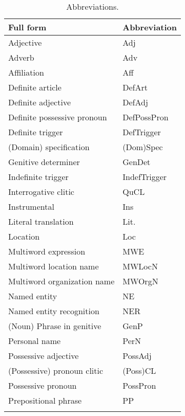 \documentclass[output=paper]{langsci/langscibook}
\begin{document}
\begin{table}
\begin{tabular}{ll}
\lsptoprule
Full form  & Abbreviation \\
\midrule
Adjective & Adj\\
Adverb & Adv\\
Affiliation & Aff\\
Definite article & DefArt\\
Definite adjective & DefAdj\\
Definite possessive pronoun & DefPossPron\\
Definite trigger & DefTrigger\\
(Domain) specification & (Dom)Spec\\
Genitive determiner & GenDet\\
Indefinite trigger & IndefTrigger\\
Interrogative clitic & QuCL\\
Instrumental & Ins\\
Literal translation & Lit.\\
Location & Loc\\
Multiword expression & MWE\\
Multiword location name & MWLocN\\
Multiword organization name & MWOrgN\\
Named entity & NE\\
Named entity recognition & NER \\
(Noun) Phrase in genitive & GenP\\
Personal name & PerN\\
Possessive adjective & PossAdj\\
(Possessive) pronoun clitic & (Poss)CL\\
Possessive pronoun & PossPron\\
Prepositional phrase & PP\\
\lspbottomrule
\end{tabular}
\caption{Abbreviations.}
\end{table}


\printbibliography[heading=subbibliography,notkeyword=this]
\end{document}
